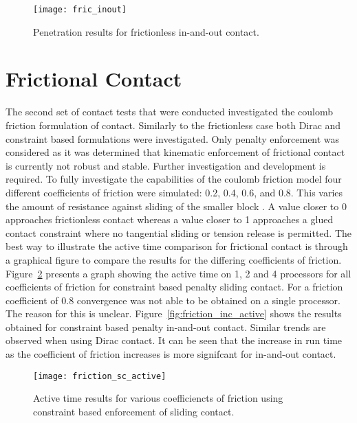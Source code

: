 \documentclass[]{article}
\begin{document}
\begin{figure}[H]
   \centering
   \texttt{[image: fric\_inout]}
   \caption{Penetration results for frictionless in-and-out contact.}
   \label{fig:fric_inout}
\end{figure}

\section{Frictional Contact}
\label{frictional_contact}

\noindent The second set of contact tests that were conducted investigated the coulomb friction formulation of contact.  Similarly to the frictionless case both Dirac and constraint based formulations were investigated.  Only penalty enforcement was considered as it was determined that kinematic enforcement of frictional contact is currently not robust and stable.  Further investigation and development is required.  To fully investigate the capabilities of the coulomb friction model four different coefficients of friction were simulated: 0.2, 0.4, 0.6, and 0.8.  This varies the amount of resistance against sliding of the smaller block .  A value closer to 0 approaches frictionless contact whereas a value closer to 1 approaches a glued contact constraint where no tangential sliding or tension release is permitted.  The best way to illustrate the active time comparison for frictional contact is through a graphical figure to compare the results for the differing coefficients of friction.  Figure~\ref{fig:friction_sc_active} presents a graph showing the active time on 1, 2 and 4 processors for all coefficients of friction for constraint based penalty sliding contact.  For a friction coefficient of 0.8 convergence was not able to be obtained on a single processor.  The reason for this is unclear.  Figure~\ref{fig:friction_inc_active} shows the results obtained for constraint based penalty in-and-out contact.  Similar trends are observed when using Dirac contact. It can be seen that the increase in run time as the coefficient of friction increases is more signifcant for in-and-out contact.

\begin{figure}[H]
   \centering
   \texttt{[image: friction\_sc\_active]}
   \caption{Active time results for various coefficiencts of friction using constraint based enforcement of sliding contact.}
   \label{fig:friction_sc_active}
\end{figure}
\end{document}
